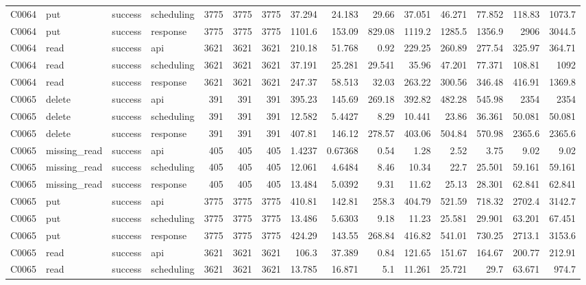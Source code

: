 \begin{landscape}
\begin{longtable}{llllrrrrrrrrrrr}
C0064 & put & success & scheduling & 3775 & 3775 & 3775 & 37.294 & 24.183 & 29.66 & 37.051 & 46.271 & 77.852 & 118.83 & 1073.7\\
C0064 & put & success & response & 3775 & 3775 & 3775 & 1101.6 & 153.09 & 829.08 & 1119.2 & 1285.5 & 1356.9 & 2906 & 3044.5\\
C0064 & read & success & api & 3621 & 3621 & 3621 & 210.18 & 51.768 & 0.92 & 229.25 & 260.89 & 277.54 & 325.97 & 364.71\\
C0064 & read & success & scheduling & 3621 & 3621 & 3621 & 37.191 & 25.281 & 29.541 & 35.96 & 47.201 & 77.371 & 108.81 & 1092\\
C0064 & read & success & response & 3621 & 3621 & 3621 & 247.37 & 58.513 & 32.03 & 263.22 & 300.56 & 346.48 & 416.91 & 1369.8\\
C0065 & delete & success & api & 391 & 391 & 391 & 395.23 & 145.69 & 269.18 & 392.82 & 482.28 & 545.98 & 2354 & 2354\\
C0065 & delete & success & scheduling & 391 & 391 & 391 & 12.582 & 5.4427 & 8.29 & 10.441 & 23.86 & 36.361 & 50.081 & 50.081\\
C0065 & delete & success & response & 391 & 391 & 391 & 407.81 & 146.12 & 278.57 & 403.06 & 504.84 & 570.98 & 2365.6 & 2365.6\\
C0065 & missing\_\allowbreak{}read & success & api & 405 & 405 & 405 & 1.4237 & 0.67368 & 0.54 & 1.28 & 2.52 & 3.75 & 9.02 & 9.02\\
C0065 & missing\_\allowbreak{}read & success & scheduling & 405 & 405 & 405 & 12.061 & 4.6484 & 8.46 & 10.34 & 22.7 & 25.501 & 59.161 & 59.161\\
C0065 & missing\_\allowbreak{}read & success & response & 405 & 405 & 405 & 13.484 & 5.0392 & 9.31 & 11.62 & 25.13 & 28.301 & 62.841 & 62.841\\
C0065 & put & success & api & 3775 & 3775 & 3775 & 410.81 & 142.81 & 258.3 & 404.79 & 521.59 & 718.32 & 2702.4 & 3142.7\\
C0065 & put & success & scheduling & 3775 & 3775 & 3775 & 13.486 & 5.6303 & 9.18 & 11.23 & 25.581 & 29.901 & 63.201 & 67.451\\
C0065 & put & success & response & 3775 & 3775 & 3775 & 424.29 & 143.55 & 268.84 & 416.82 & 541.01 & 730.25 & 2713.1 & 3153.6\\
C0065 & read & success & api & 3621 & 3621 & 3621 & 106.3 & 37.389 & 0.84 & 121.65 & 151.67 & 164.67 & 200.77 & 212.91\\
C0065 & read & success & scheduling & 3621 & 3621 & 3621 & 13.785 & 16.871 & 5.1 & 11.261 & 25.721 & 29.7 & 63.671 & 974.7\\

\end{longtable}
\end{landscape}
